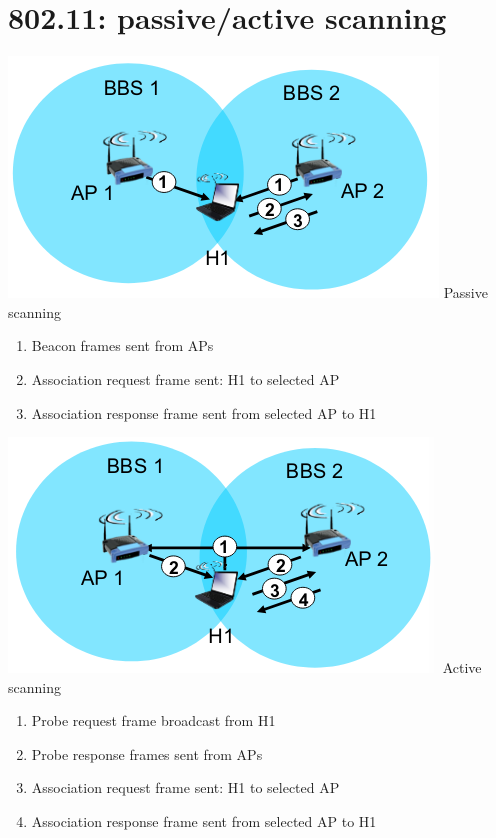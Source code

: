 \documentclass{article}[18pt]
\begin{document}
\section{802.11: passive/active scanning}
\begin{minipage}{0.5\textwidth}
\includegraphics[scale=0.7]{"passive scanning"}
Passive scanning
\begin{enumerate}
	\item Beacon frames sent from APs
	\item Association request frame sent: H1 to selected AP
	\item Association response frame sent from selected AP to H1
\end{enumerate}
\end{minipage}
\begin{minipage}{0.5\textwidth}
\includegraphics[scale=0.7]{"active scanning"}
Active scanning
\begin{enumerate}
	\item Probe request frame broadcast from H1
	\item Probe response frames sent from APs
	\item Association request frame sent: H1 to selected AP
	\item Association response frame sent from selected AP to H1
\end{enumerate}
\end{minipage}
\end{document}
